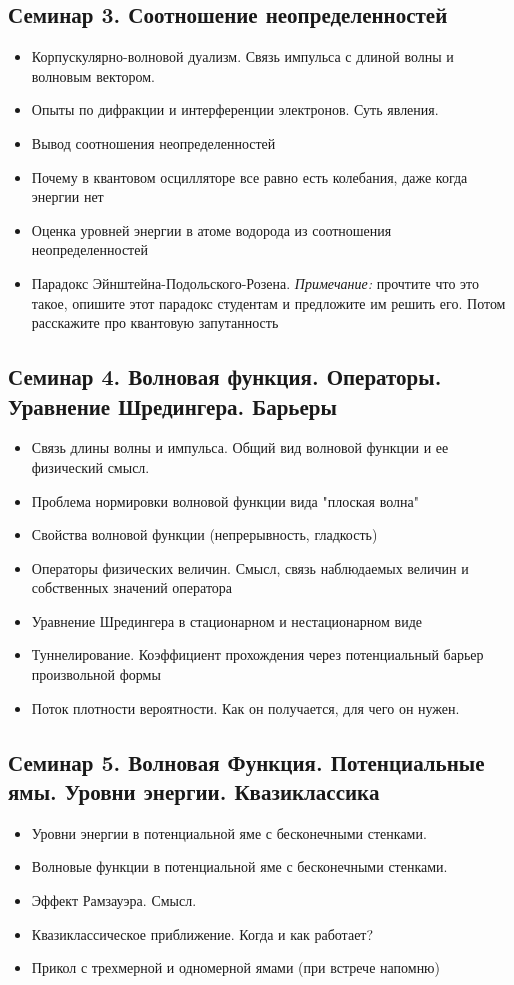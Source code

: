 \documentclass[12pt]{article}
\begin{document}
\subsection*{Семинар 3. Соотношение неопределенностей}
\begin{itemize}
    \item Корпускулярно-волновой дуализм. Связь импульса с длиной волны и волновым вектором. 
    \item Опыты по дифракции и интерференции электронов. Суть явления.
    \item Вывод соотношения неопределенностей
    \item Почему в квантовом осцилляторе  все равно есть колебания, даже когда энергии нет
    \item Оценка уровней энергии в атоме водорода из соотношения неопределенностей
    \item Парадокс Эйнштейна-Подольского-Розена. \textit{Примечание:} прочтите что это такое, опишите этот парадокс студентам и предложите им решить его. Потом расскажите про квантовую запутанность 
\end{itemize}

\subsection*{Семинар 4. Волновая функция. Операторы. Уравнение Шредингера. Барьеры}
\begin{itemize}
    \item Связь длины волны и импульса. Общий вид волновой функции и ее физический смысл. 
    \item Проблема нормировки волновой функции вида "плоская волна"
    \item Свойства волновой функции (непрерывность, гладкость)
    \item Операторы физических величин. Смысл, связь наблюдаемых величин и собственных значений оператора
    \item Уравнение Шредингера в стационарном и нестационарном виде
    \item Туннелирование. Коэффициент прохождения через потенциальный барьер произвольной формы
    \item Поток плотности вероятности. Как он получается, для чего он нужен.
\end{itemize}

\subsection*{Семинар 5. Волновая Функция. Потенциальные ямы. Уровни энергии. Квазиклассика}
\begin{itemize}
    \item Уровни энергии в потенциальной яме с бесконечными стенками.
    \item Волновые функции в потенциальной яме с бесконечными стенками.
    \item Эффект Рамзауэра. Смысл.
    \item Квазиклассическое приближение. Когда и как работает?
    \item Прикол с трехмерной и одномерной ямами (при встрече напомню)
\end{itemize}
\end{document}
